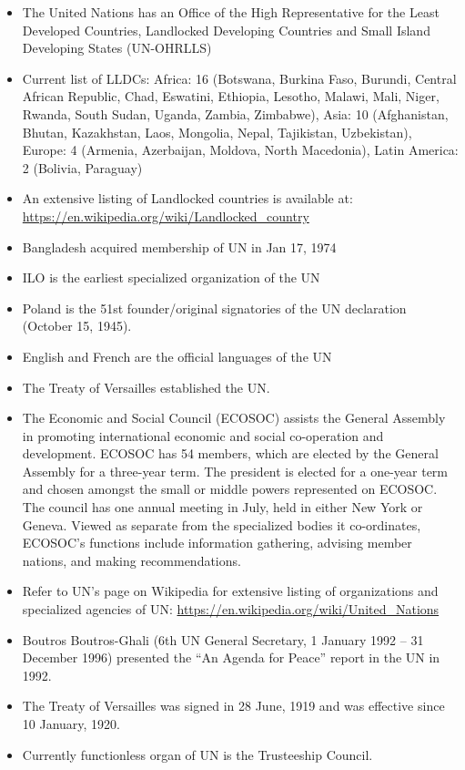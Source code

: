 \documentclass[
]{book}
\begin{document}
\begin{itemize}
\item
  The United Nations has an Office of the High Representative for the Least Developed Countries, Landlocked Developing Countries and Small Island Developing States (UN-OHRLLS)
\item
  Current list of LLDCs: Africa: 16 (Botswana, Burkina Faso, Burundi, Central African Republic, Chad, Eswatini, Ethiopia, Lesotho, Malawi, Mali, Niger, Rwanda, South Sudan, Uganda, Zambia, Zimbabwe), Asia: 10 (Afghanistan, Bhutan, Kazakhstan, Laos, Mongolia, Nepal, Tajikistan, Uzbekistan), Europe: 4 (Armenia, Azerbaijan, Moldova, North Macedonia), Latin America: 2 (Bolivia, Paraguay)
\item
  An extensive listing of Landlocked countries is available at: \url{https://en.wikipedia.org/wiki/Landlocked_country}
\item
  Bangladesh acquired membership of UN in Jan 17, 1974
\item
  ILO is the earliest specialized organization of the UN
\item
  Poland is the 51st founder/original signatories of the UN declaration (October 15, 1945).
\item
  English and French are the official languages of the UN
\item
  The Treaty of Versailles established the UN.
\item
  The Economic and Social Council (ECOSOC) assists the General Assembly in promoting international economic and social co-operation and development. ECOSOC has 54 members, which are elected by the General Assembly for a three-year term. The president is elected for a one-year term and chosen amongst the small or middle powers represented on ECOSOC. The council has one annual meeting in July, held in either New York or Geneva. Viewed as separate from the specialized bodies it co-ordinates, ECOSOC's functions include information gathering, advising member nations, and making recommendations.
\item
  Refer to UN's page on Wikipedia for extensive listing of organizations and specialized agencies of UN: \url{https://en.wikipedia.org/wiki/United_Nations}
\item
  Boutros Boutros-Ghali (6th UN General Secretary, 1 January 1992 -- 31 December 1996) presented the ``An Agenda for Peace'' report in the UN in 1992.
\item
  The Treaty of Versailles was signed in 28 June, 1919 and was effective since 10 January, 1920.
\item
  Currently functionless organ of UN is the Trusteeship Council.

\end{itemize}
\end{document}
